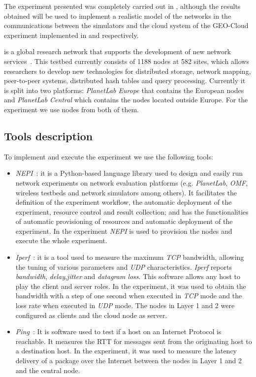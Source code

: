 The experiment presented was completely carried out in \pl, although the results obtained will be used to implement a realistic model of the networks in the communications between the simulators and the cloud system of the GEO-Cloud experiment implemented in \vw and \bonfire respectively.

\pl is a global research network that supports the development of new network
services~\cite{Europe2014}. This testbed currently consists of 1188 nodes at 582
sites, which allows researchers to develop new technologies for distributed
storage, network mapping, peer-to-peer systems, distributed hash tables and
query processing. Currently it is split into two platforms: \emph{PlanetLab
  Europe} that contains the European nodes and \emph{PlanetLab Central} which
contains the nodes located outside Europe.
For the experiment we use nodes from both of them.

\subsection{Tools description}

To implement and execute the experiment we use the following tools:
\begin{itemize}
\item \emph{NEPI}~\cite{INRIA2014}: it is a Python-based language library used to design and easily run network experiments on network evaluation platforms (e.g. \emph{PlanetLab}, \emph{OMF}, wireless testbeds and network simulators among others). It facilitates the definition of the experiment workflow, the automatic deployment of the experiment, resource control and result collection; and has the functionalities of automatic provisioning of resources and automatic deployment of the experiment. In the experiment \emph{NEPI} is used to provision the nodes and execute the whole experiment.
\item \emph{Iperf}~\cite{Iperf2014}: it is a tool used to measure the maximum
  \emph{TCP} bandwidth, allowing the tuning of various parameters and \emph{UDP}
  characteristics. \emph{Iperf} reports \emph{bandwidth},
  \emph{delay},\emph{jitter} and \emph{datagram loss}. This software allows any
  host to play the client and server roles. In the experiment, it was used to obtain the bandwidth with a step of one second when executed in \emph{TCP} mode and the loss rate when executed in \emph{UDP} mode. The nodes in Layer 1 and 2 were configured as clients and the cloud node as server.
\item \emph{Ping}~\cite{Pelsser2013}: It is
  software used to test if a host on an Internet Protocol is reachable. It
  measures the \ac{RTT} for messages sent from the originating host to a
  destination host. In the experiment, it was used to measure the latency
  delivery  of a package over the Internet between the nodes in Layer 1 and 2 and the central node.
\end{itemize}

